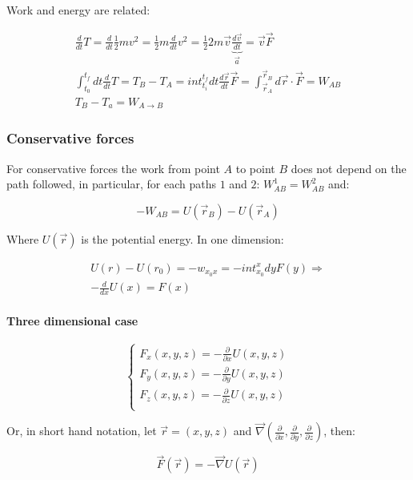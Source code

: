   Work and energy are related:

  \begin{align*}
    \frac{d{}}{d{t}}T = \frac{d{}}{d{t}}\frac{1}{2}mv^2 = \frac{1}{2}m \frac{d{}}{d{t}}v^2 = \frac{1}{2}2m \vec{v}\underbrace{\frac{d{\vec{v}}}{d{t}}}_{\vec{a}} = \vec{v} \vec{F}\\
    \int_{t_0}^{t_f}dt \frac{d{}}{d{t}}T = T_B-T_A = int_{t_i}^{t_f}dt \frac{d{\vec{r}}}{d{t}}\vec{F} = \int_{\vec{r}_A}^{\vec{r}_B} d \vec{r}\cdot \vec{F} = W_{AB}\\
    T_B-T_a = W_{A\rightarrow B}
  \end{align*}

    \subsubsection{Conservative forces}
    For conservative forces the work from point $A$ to point $B$ does not depend on the path followed, in particular, for each paths $1$ and $2$: $W_{AB}^1 = W_{AB}^2$ and:

    $$-W_{AB} = U(\vec{r}_B) - U(\vec{r}_A)$$

    Where $U(\vec{r})$ is the potential energy.
    In one dimension:

    \begin{align*}
      U(r) -U(r_0) = -w_{x_0x} = -int_{x_0}^xdyF(y) \Rightarrow\\
      -\frac{d{}}{d{x}}U(x) = F(x)
    \end{align*}

      \paragraph{Three dimensional case}
  
      $$\begin{cases}
        F_x(x,y,z) = - \frac{\partial {}}{\partial {x}}U(x,y,z)\\
        F_y(x,y,z) = - \frac{\partial {}}{\partial {y}}U(x,y,z)\\
        F_z(x,y,z) = - \frac{\partial {}}{\partial {z}}U(x,y,z)\\
      \end{cases}$$
  
      Or, in short hand notation, let $\vec{r}=(x,y,z)$ and $\vec{\nabla}(\frac{\partial {}}{\partial {x}},\frac{\partial {}}{\partial {y}},\frac{\partial {}}{\partial {z}})$, then:
  
      $$\vec{F}(\vec{r}) = -\vec{\nabla}U(\vec{r})$$
  
